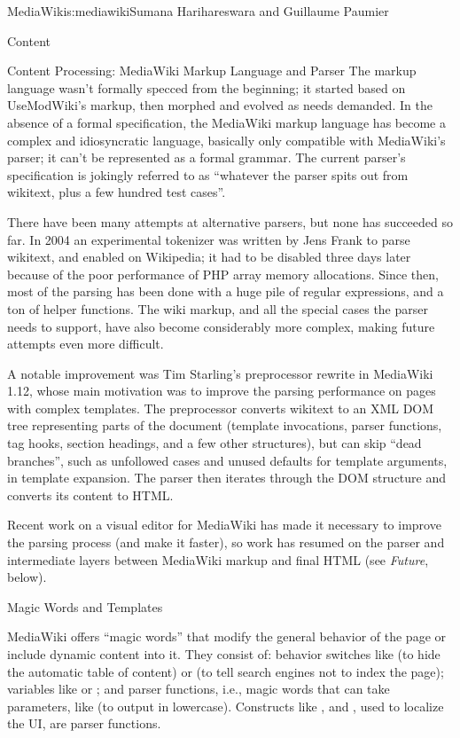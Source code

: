\begin{aosachapter}{MediaWiki}{s:mediawiki}{Sumana Harihareswara and Guillaume Paumier}
\begin{aosasect1}{Content}
\begin{aosasect2}{Content Processing: MediaWiki Markup Language and Parser}
The markup language wasn't formally specced from the beginning; it
started based on UseModWiki's markup, then morphed and evolved as
needs demanded. In the absence of a formal specification, the
MediaWiki markup language has become a complex and idiosyncratic
language, basically only compatible with MediaWiki's parser; it can't
be represented as a formal grammar. The current parser's specification
is jokingly referred to as ``whatever the parser spits out from
wikitext, plus a few hundred test cases''.

There have been many attempts at alternative parsers, but none has
succeeded so far. In 2004 an experimental tokenizer was written by
Jens Frank to parse wikitext, and enabled on Wikipedia; it had to be
disabled three days later because of the poor performance of PHP
array memory allocations. Since then, most of the parsing has been
done with a huge pile of regular expressions, and a ton of helper
functions. The wiki markup, and all the special cases the parser needs
to support, have also become considerably more complex, making future
attempts even more difficult.

A notable improvement was Tim Starling's preprocessor rewrite in
MediaWiki 1.12, whose main motivation was to improve the parsing
performance on pages with complex templates. The preprocessor converts
wikitext to an XML DOM tree representing parts of the document
(template invocations, parser functions, tag hooks, section headings,
and a few other structures), but can skip ``dead branches'', 
such as unfollowed  cases and unused defaults
for template arguments, in template expansion. The parser then iterates through the DOM
structure and converts its content to HTML.

Recent work on a visual editor for MediaWiki has made it necessary to
improve the parsing process (and make it faster), so work has resumed
on the parser and intermediate layers between MediaWiki markup and
final HTML (see \emph{Future}, below).

\end{aosasect2}

\begin{aosasect2}{Magic Words and Templates}

MediaWiki offers ``magic words'' that modify the general behavior of the
page or include dynamic content into it. They consist of: behavior
switches like  (to hide the automatic table of
content) or  (to tell search engines not to index
the page); variables like  or
; and parser functions, i.e., magic words that can
take parameters, like 
(to output  in
lowercase). Constructs like ,  and
, used to localize the UI, are parser functions.


\end{aosasect2}
\end{aosasect1}
\end{aosachapter}
